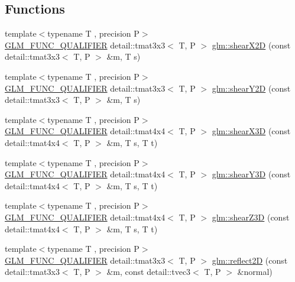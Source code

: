 \subsection*{Functions}
\begin{DoxyCompactItemize}
\item 
{\footnotesize template$<$typename T , precision P$>$ }\\\hyperlink{setup_8hpp_a33fdea6f91c5f834105f7415e2a64407}{G\+L\+M\+\_\+\+F\+U\+N\+C\+\_\+\+Q\+U\+A\+L\+I\+F\+I\+ER} detail\+::tmat3x3$<$ T, P $>$ \hyperlink{group__gtx__transform2_gaa5a2d9216b3298b03252e549de6fd98a}{glm\+::shear\+X2D} (const detail\+::tmat3x3$<$ T, P $>$ \&m, T s)
\item 
{\footnotesize template$<$typename T , precision P$>$ }\\\hyperlink{setup_8hpp_a33fdea6f91c5f834105f7415e2a64407}{G\+L\+M\+\_\+\+F\+U\+N\+C\+\_\+\+Q\+U\+A\+L\+I\+F\+I\+ER} detail\+::tmat3x3$<$ T, P $>$ \hyperlink{group__gtx__transform2_ga1f5e68ada7a56cdf86c0c56d0b0a1832}{glm\+::shear\+Y2D} (const detail\+::tmat3x3$<$ T, P $>$ \&m, T s)
\item 
{\footnotesize template$<$typename T , precision P$>$ }\\\hyperlink{setup_8hpp_a33fdea6f91c5f834105f7415e2a64407}{G\+L\+M\+\_\+\+F\+U\+N\+C\+\_\+\+Q\+U\+A\+L\+I\+F\+I\+ER} detail\+::tmat4x4$<$ T, P $>$ \hyperlink{group__gtx__transform2_gaae5bbb490a3d798b083cbec0e0c2e94c}{glm\+::shear\+X3D} (const detail\+::tmat4x4$<$ T, P $>$ \&m, T s, T t)
\item 
{\footnotesize template$<$typename T , precision P$>$ }\\\hyperlink{setup_8hpp_a33fdea6f91c5f834105f7415e2a64407}{G\+L\+M\+\_\+\+F\+U\+N\+C\+\_\+\+Q\+U\+A\+L\+I\+F\+I\+ER} detail\+::tmat4x4$<$ T, P $>$ \hyperlink{group__gtx__transform2_ga4b5af90ecf76d312bb371f6111e1ae35}{glm\+::shear\+Y3D} (const detail\+::tmat4x4$<$ T, P $>$ \&m, T s, T t)
\item 
{\footnotesize template$<$typename T , precision P$>$ }\\\hyperlink{setup_8hpp_a33fdea6f91c5f834105f7415e2a64407}{G\+L\+M\+\_\+\+F\+U\+N\+C\+\_\+\+Q\+U\+A\+L\+I\+F\+I\+ER} detail\+::tmat4x4$<$ T, P $>$ \hyperlink{group__gtx__transform2_ga02fa747667daf42b64ea344d1076acee}{glm\+::shear\+Z3D} (const detail\+::tmat4x4$<$ T, P $>$ \&m, T s, T t)
\item 
{\footnotesize template$<$typename T , precision P$>$ }\\\hyperlink{setup_8hpp_a33fdea6f91c5f834105f7415e2a64407}{G\+L\+M\+\_\+\+F\+U\+N\+C\+\_\+\+Q\+U\+A\+L\+I\+F\+I\+ER} detail\+::tmat3x3$<$ T, P $>$ \hyperlink{namespaceglm_a8da591eb7bc7747abb311d91162e0e13}{glm\+::reflect2D} (const detail\+::tmat3x3$<$ T, P $>$ \&m, const detail\+::tvec3$<$ T, P $>$ \&normal)

\end{DoxyCompactItemize}
